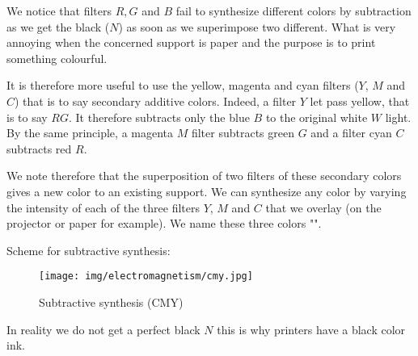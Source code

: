 	We notice that filters $R, G$ and $B$ fail to synthesize different colors by subtraction as we get the black ($N$) as soon as we superimpose two different. What is very annoying when the concerned support is paper and the purpose is to print something colourful.
	
	It is therefore more useful to use the yellow, magenta and cyan filters ($Y$, $M$ and $C$) that is to say secondary additive colors. Indeed, a filter $Y$ let pass yellow, that is to say $RG$. It therefore subtracts only the blue $B$ to the original white $W$ light. By the same principle, a magenta $M$ filter subtracts green $G$ and a filter cyan $C$ subtracts red $R$.
	
	We note therefore that the superposition of two filters of these secondary colors gives a new color to an existing support. We can synthesize any color by varying the intensity of each of the three filters $Y$, $M$ and $C$ that we overlay (on the projector or paper for example). We name these three colors "".
	
	Scheme for subtractive synthesis:
	\begin{figure}[H]
		\centering
		\texttt{[image: img/electromagnetism/cmy.jpg]}
		\caption{Subtractive synthesis (CMY)}
	\end{figure}
	In reality we do not get a perfect black $N$ this is why printers have a black color ink.
	
